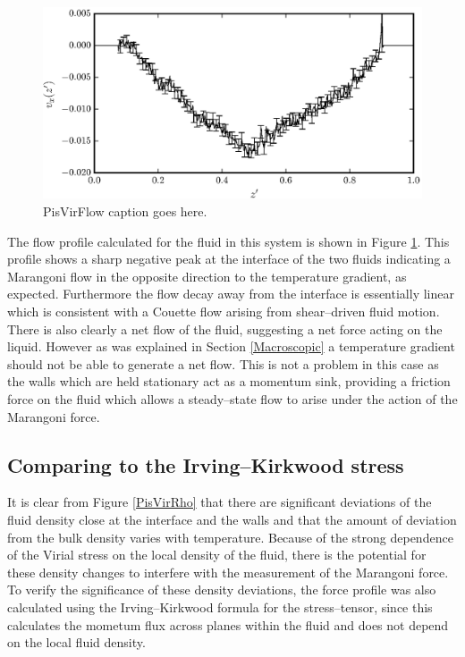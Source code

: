 \begin{figure}[h]
\centering
\includegraphics[scale=0.8]{PisVirFlow}
\caption{PisVirFlow caption goes here.}
\label{PisVirFlow}
\end{figure}
\FloatBarrier
The flow profile calculated for the fluid in this system is shown in Figure \ref{PisVirFlow}. 
This profile shows a sharp negative peak at the interface of the two fluids indicating a Marangoni flow in the opposite direction to the temperature gradient, as expected.
Furthermore the flow decay away from the interface is essentially linear which is consistent with a Couette flow arising from shear--driven fluid motion.
There is also clearly a net flow of the fluid, suggesting a net force acting on the liquid.
However as was explained in Section \ref{Macroscopic} a temperature gradient should not be able to generate a net flow. 
This is not a problem in this case as the walls which are held stationary act as a momentum sink, providing a friction force on the fluid which allows a steady--state flow to arise under the action of the Marangoni force.
\FloatBarrier

\subsection{Comparing to the Irving--Kirkwood stress}
It is clear from Figure \ref{PisVirRho} that there are significant deviations of the fluid density close at the interface and the walls and that the amount of deviation from the bulk density varies with temperature.
Because of the strong dependence of the Virial stress on the local density of the fluid, there is the potential for these density changes to interfere with the measurement of the Marangoni force.
To verify the significance of these density deviations, the force profile was also calculated using the Irving--Kirkwood formula for the stress--tensor, since this calculates the mometum flux across planes within the fluid and does not depend on the local fluid density.

